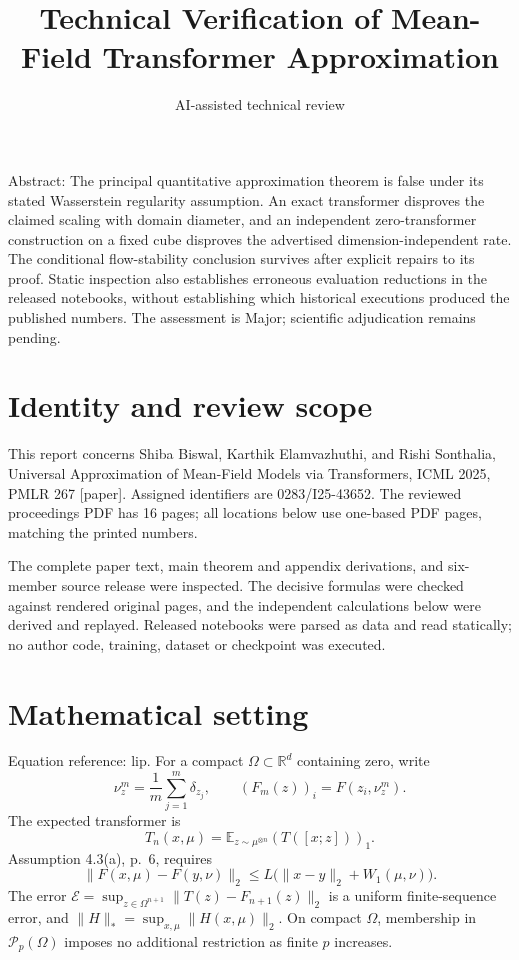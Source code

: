 \documentclass[10pt]{article}
\title{Technical Verification of Mean-Field Transformer Approximation}
\author{AI-assisted technical review}
\date{}
\begin{document}
\maketitle
Abstract: The principal quantitative approximation theorem is false under its stated Wasserstein regularity assumption. An exact transformer disproves the claimed scaling with domain diameter, and an independent zero-transformer construction on a fixed cube disproves the advertised dimension-independent rate. The conditional flow-stability conclusion survives after explicit repairs to its proof. Static inspection also establishes erroneous evaluation reductions in the released notebooks, without establishing which historical executions produced the published numbers. The assessment is Major; scientific adjudication remains pending.\par
\section*{Identity and review scope}
This report concerns Shiba Biswal, Karthik Elamvazhuthi, and Rishi Sonthalia, Universal Approximation of Mean-Field Models via Transformers, ICML 2025, PMLR 267 [paper]. Assigned identifiers are 0283/I25-43652. The reviewed proceedings PDF has 16 pages; all locations below use one-based PDF pages, matching the printed numbers.\par
The complete paper text, main theorem and appendix derivations, and six-member source release were inspected. The decisive formulas were checked against rendered original pages, and the independent calculations below were derived and replayed. Released notebooks were parsed as data and read statically; no author code, training, dataset or checkpoint was executed.\par
\section*{Mathematical setting}
Equation reference: lip. For a compact \(\Omega\subset\mathbb R^d\) containing zero, write \[\nu_z^m=\frac1m\sum_{j=1}^m\delta_{z_j},\qquad
 (F_m(z))_i=F(z_i,\nu_z^m).\] The expected transformer is \[T_n(x,\mu)=\mathbb E_{z\sim\mu^{\otimes n}}(T([x;z]))_1.\] Assumption 4.3(a), p. 6, requires \[
 \|F(x,\mu)-F(y,\nu)\|_2
 \le L\bigl(\|x-y\|_2+W_1(\mu,\nu)\bigr).\] The error \(\mathcal E=\sup_{z\in\Omega^{n+1}}\|T(z)-F_{n+1}(z)\|_2\) is a uniform finite-sequence error, and \(\|H\|_*=\sup_{x,\mu}\|H(x,\mu)\|_2\). On compact \(\Omega\), membership in \(\mathcal P_p(\Omega)\) imposes no additional restriction as finite \(p\) increases.\par
\end{document}

